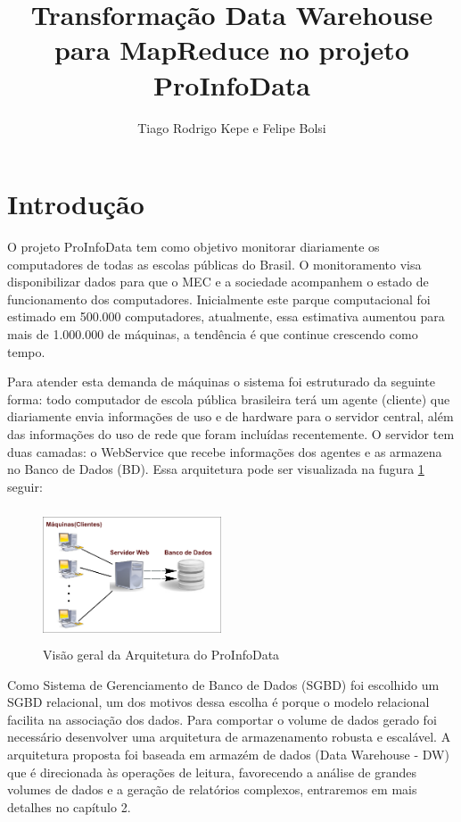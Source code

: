 \documentclass[a4paper,12pt]{article}
\title{Transformação Data Warehouse para MapReduce no projeto ProInfoData}
\author{Tiago Rodrigo Kepe e Felipe Bolsi}
\begin{document}
\maketitle

\section{\textbf{Introdução}}

O projeto ProInfoData tem como objetivo monitorar diariamente os computadores de
todas as escolas públicas do Brasil. O monitoramento visa disponibilizar dados
para que o MEC e a sociedade acompanhem o estado de funcionamento dos
computadores. Inicialmente este parque computacional foi estimado em 500.000
computadores, atualmente, essa estimativa aumentou para mais de 1.000.000 de
máquinas, a tendência é que continue crescendo como tempo.
 
Para atender esta demanda de máquinas o sistema foi estruturado da
seguinte forma: todo computador de escola pública brasileira terá um agente (cliente)
que diariamente envia informações de uso e de hardware para o servidor central,
além das informações do uso de rede que foram incluídas recentemente. O servidor
tem duas camadas: o WebService que recebe informações dos agentes e as armazena
no Banco de Dados (BD). Essa arquitetura pode ser visualizada na fugura \ref{arquiteturaBD}
seguir:\newline

\begin{figure}[ht]
  \centering
  \includegraphics[width=200px,height=150px]{img/arq-bd.png}
  \caption{Visão geral da Arquitetura do ProInfoData}
  \label{arquiteturaBD}
\end{figure}

Como Sistema de Gerenciamento de Banco de Dados (SGBD) foi escolhido um SGBD
relacional, um dos motivos dessa escolha é porque o modelo relacional facilita
na associação dos dados. Para comportar o volume de dados gerado foi necessário
desenvolver uma arquitetura de armazenamento robusta e escalável. A arquitetura
proposta foi baseada em armazém de dados (Data Warehouse - DW) que é direcionada
às operações de leitura, favorecendo a análise de grandes volumes de dados e a
geração de relatórios complexos, entraremos em mais detalhes no capítulo 2.
\end{document}
